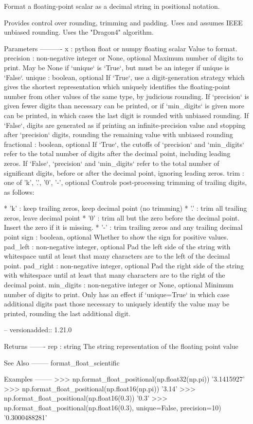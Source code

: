 \begin{DoxyVerb}Format a floating-point scalar as a decimal string in positional notation.

Provides control over rounding, trimming and padding. Uses and assumes
IEEE unbiased rounding. Uses the "Dragon4" algorithm.

Parameters
----------
x : python float or numpy floating scalar
    Value to format.
precision : non-negative integer or None, optional
    Maximum number of digits to print. May be None if `unique` is
    `True`, but must be an integer if unique is `False`.
unique : boolean, optional
    If `True`, use a digit-generation strategy which gives the shortest
    representation which uniquely identifies the floating-point number from
    other values of the same type, by judicious rounding. If `precision`
    is given fewer digits than necessary can be printed, or if `min_digits`
    is given more can be printed, in which cases the last digit is rounded
    with unbiased rounding.
    If `False`, digits are generated as if printing an infinite-precision
    value and stopping after `precision` digits, rounding the remaining
    value with unbiased rounding
fractional : boolean, optional
    If `True`, the cutoffs of `precision` and `min_digits` refer to the
    total number of digits after the decimal point, including leading
    zeros.
    If `False`, `precision` and `min_digits` refer to the total number of
    significant digits, before or after the decimal point, ignoring leading
    zeros.
trim : one of 'k', '.', '0', '-', optional
    Controls post-processing trimming of trailing digits, as follows:

    * 'k' : keep trailing zeros, keep decimal point (no trimming)
    * '.' : trim all trailing zeros, leave decimal point
    * '0' : trim all but the zero before the decimal point. Insert the
      zero if it is missing.
    * '-' : trim trailing zeros and any trailing decimal point
sign : boolean, optional
    Whether to show the sign for positive values.
pad_left : non-negative integer, optional
    Pad the left side of the string with whitespace until at least that
    many characters are to the left of the decimal point.
pad_right : non-negative integer, optional
    Pad the right side of the string with whitespace until at least that
    many characters are to the right of the decimal point.
min_digits : non-negative integer or None, optional
    Minimum number of digits to print. Only has an effect if `unique=True`
    in which case additional digits past those necessary to uniquely
    identify the value may be printed, rounding the last additional digit.
    
    -- versionadded:: 1.21.0

Returns
-------
rep : string
    The string representation of the floating point value

See Also
--------
format_float_scientific

Examples
--------
>>> np.format_float_positional(np.float32(np.pi))
'3.1415927'
>>> np.format_float_positional(np.float16(np.pi))
'3.14'
>>> np.format_float_positional(np.float16(0.3))
'0.3'
>>> np.format_float_positional(np.float16(0.3), unique=False, precision=10)
'0.3000488281'
\end{DoxyVerb}
